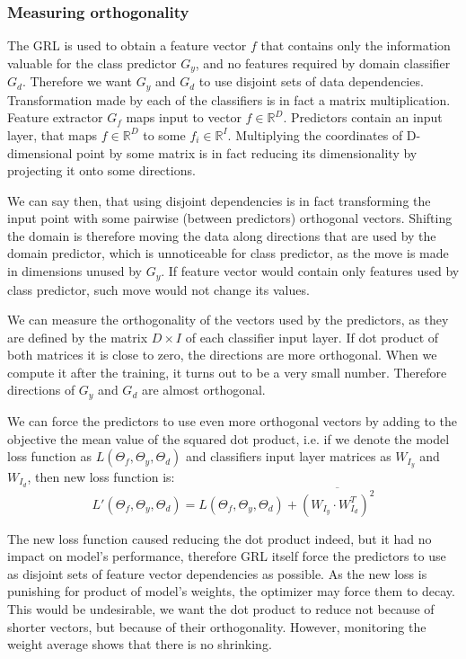 \documentclass{article}
\begin{document}
\subsubsection{Measuring orthogonality}
The GRL is used to obtain a feature vector $f$ that contains only the information valuable for the class predictor $G_{y}$, and no features required by domain classifier $G_{d}$. Therefore we want $G_{y}$ and $G_{d}$ to use disjoint sets of data dependencies. Transformation made by each of the classifiers is in fact a matrix multiplication. Feature extractor $G_{f}$ maps input to vector $f \in \mathbb{R}^{D}$. Predictors contain an input layer, that maps $f \in \mathbb{R}^{D}$ to some $f_{i} \in \mathbb{R}^{I}$. Multiplying the coordinates of D-dimensional point by some matrix is in fact reducing its dimensionality by projecting it onto some directions. 
\par
We can say then, that using disjoint dependencies is in fact transforming the input point with some pairwise (between predictors) orthogonal vectors. Shifting the domain is therefore moving the data along directions that are used by the domain predictor, which is unnoticeable for class predictor, as the move is made in dimensions unused by $G_{y}$. If feature vector would contain only features used by class predictor, such move would not change its values. 
\par
We can measure the orthogonality of the vectors used by the predictors, as they are defined by the matrix $D \times I$ of each classifier input layer. If dot product of both matrices it is close to zero, the directions are more orthogonal. When we compute it after the training, it turns out to be a very small number. Therefore directions of $G_{y}$ and $G_{d}$ are almost orthogonal.
\par
We can force the predictors to use even more orthogonal vectors by adding to the objective the mean value of the squared dot product, i.e. if we denote the model loss function as $L(\Theta_{f}, \Theta_{y}, \Theta_{d})$ and classifiers input layer matrices as $W_{I_{y}}$ and $W_{I_{d}}$, then new loss function is:
\begin{equation*}
L'(\Theta_{f}, \Theta_{y}, \Theta_{d}) = L(\Theta_{f}, \Theta_{y}, \Theta_{d}) + \overline{(W_{I_{y}} \cdot W_{I_{d}}^{T})^{2}}
\end{equation*}
\par
The new loss function caused reducing the dot product indeed, but it had no impact on model's performance, therefore GRL itself force the predictors to use as disjoint sets of feature vector dependencies as possible. As the new loss is punishing for product of model's weights, the optimizer may force them to decay. This would be undesirable, we want the dot product to reduce not because of shorter vectors, but because of their orthogonality. However, monitoring the weight average shows that there is no shrinking. 
\end{document}
